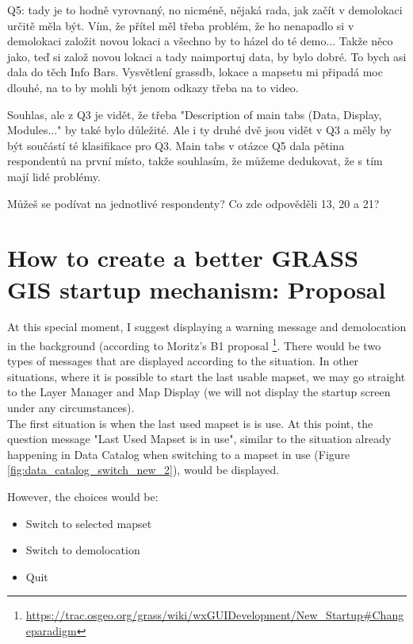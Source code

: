 \documentclass[a4paper,10pt,twoside]{article}
\begin{document}
    Q5: tady je to hodně vyrovnaný, no nicméně, nějaká rada, jak začít v demolokaci určitě měla být. Vím, že přítel měl třeba problém, že ho nenapadlo si v demolokaci založit novou lokaci a všechno by to házel do té demo... Takže něco jako, teď si založ novou lokaci a tady naimportuj data, by bylo dobré. To bych asi dala do těch Info Bars. Vysvětlení grassdb, lokace a mapsetu mi připadá moc dlouhé, na to by mohli být jenom odkazy třeba na to video. 
    
    Souhlas, ale z Q3 je vidět, že třeba "Description of main tabs (Data, Display, Modules..." by také bylo důležité. Ale i ty druhé dvě jsou vidět v Q3 a měly by být součástí té klasifikace pro Q3.
    Main tabs v otázce Q5 dala pětina respondentů na první místo, takže souhlasím, že můžeme dedukovat, že s tím mají lidé problémy.

Můžeš se podívat na jednotlivé respondenty? Co zde odpověděli 13, 20 a 21?
    
    
\newpage
\vspace*{-1cm}
\section{How to create a better GRASS GIS startup mechanism: Proposal}
\noindent
\large
At this special moment, I suggest displaying a warning message and demolocation in the background (according to Moritz's B1 proposal \footnote{\url{https://trac.osgeo.org/grass/wiki/wxGUIDevelopment/New\_Startup\#Changeparadigm}}. There would be two types of messages that are displayed according to the situation. In other situations, where it is possible to start the last usable mapset, we may go straight to the Layer Manager and Map Display (we will not display the startup screen under any circumstances). \\

\noindent The first situation is when the last used mapset is is use. At this point, the question message  "Last Used Mapset is in use", similar to the situation already happening in Data Catalog when switching to a mapset in use (Figure \ref{fig:data_catalog_switch_new_2}), would be displayed.

However, the choices would be:
\begin{itemize}
\item Switch to selected mapset
\end{itemize}
\begin{itemize}
\item Switch to demolocation
\end{itemize}
\begin{itemize}
\item Quit
\end{itemize}
\end{document}
